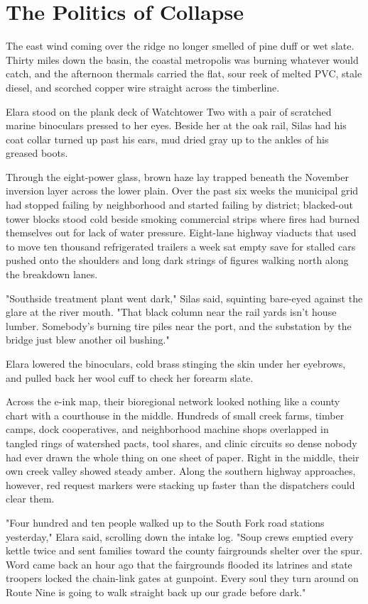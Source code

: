 \chapter{The Politics of Collapse}

The east wind coming over the ridge no longer smelled of pine duff or wet slate. Thirty miles down the basin, the coastal metropolis was burning whatever would catch, and the afternoon thermals carried the flat, sour reek of melted PVC, stale diesel, and scorched copper wire straight across the timberline.

Elara stood on the plank deck of Watchtower Two with a pair of scratched marine binoculars pressed to her eyes. Beside her at the oak rail, Silas had his coat collar turned up past his ears, mud dried gray up to the ankles of his greased boots.

Through the eight-power glass, brown haze lay trapped beneath the November inversion layer across the lower plain. Over the past six weeks the municipal grid had stopped failing by neighborhood and started failing by district; blacked-out tower blocks stood cold beside smoking commercial strips where fires had burned themselves out for lack of water pressure. Eight-lane highway viaducts that used to move ten thousand refrigerated trailers a week sat empty save for stalled cars pushed onto the shoulders and long dark strings of figures walking north along the breakdown lanes.

"Southside treatment plant went dark," Silas said, squinting bare-eyed against the glare at the river mouth. "That black column near the rail yards isn't house lumber. Somebody's burning tire piles near the port, and the substation by the bridge just blew another oil bushing."

Elara lowered the binoculars, cold brass stinging the skin under her eyebrows, and pulled back her wool cuff to check her forearm slate.

Across the e-ink map, their bioregional network looked nothing like a county chart with a courthouse in the middle. Hundreds of small creek farms, timber camps, dock cooperatives, and neighborhood machine shops overlapped in tangled rings of watershed pacts, tool shares, and clinic circuits so dense nobody had ever drawn the whole thing on one sheet of paper. Right in the middle, their own creek valley showed steady amber. Along the southern highway approaches, however, red request markers were stacking up faster than the dispatchers could clear them.

"Four hundred and ten people walked up to the South Fork road stations yesterday," Elara said, scrolling down the intake log. "Soup crews emptied every kettle twice and sent families toward the county fairgrounds shelter over the spur. Word came back an hour ago that the fairgrounds flooded its latrines and state troopers locked the chain-link gates at gunpoint. Every soul they turn around on Route Nine is going to walk straight back up our grade before dark."

